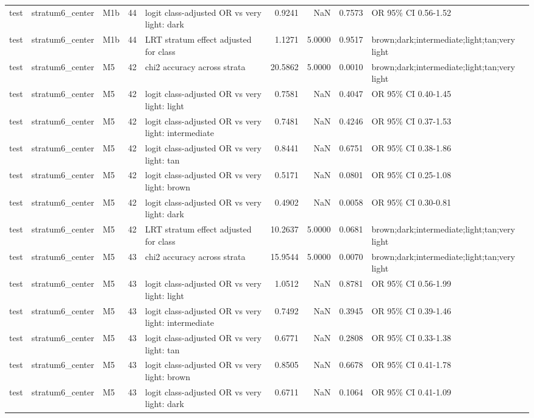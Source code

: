 \begin{tabular}{lllrlrrrl}
test & stratum6\_center & M1b & 44 & logit class-adjusted OR vs very light: dark & 0.9241 & NaN & 0.7573 & OR 95\% CI 0.56-1.52 \\
test & stratum6\_center & M1b & 44 & LRT stratum effect adjusted for class & 1.1271 & 5.0000 & 0.9517 & brown;dark;intermediate;light;tan;very light \\
test & stratum6\_center & M5 & 42 & chi2 accuracy across strata & 20.5862 & 5.0000 & 0.0010 & brown;dark;intermediate;light;tan;very light \\
test & stratum6\_center & M5 & 42 & logit class-adjusted OR vs very light: light & 0.7581 & NaN & 0.4047 & OR 95\% CI 0.40-1.45 \\
test & stratum6\_center & M5 & 42 & logit class-adjusted OR vs very light: intermediate & 0.7481 & NaN & 0.4246 & OR 95\% CI 0.37-1.53 \\
test & stratum6\_center & M5 & 42 & logit class-adjusted OR vs very light: tan & 0.8441 & NaN & 0.6751 & OR 95\% CI 0.38-1.86 \\
test & stratum6\_center & M5 & 42 & logit class-adjusted OR vs very light: brown & 0.5171 & NaN & 0.0801 & OR 95\% CI 0.25-1.08 \\
test & stratum6\_center & M5 & 42 & logit class-adjusted OR vs very light: dark & 0.4902 & NaN & 0.0058 & OR 95\% CI 0.30-0.81 \\
test & stratum6\_center & M5 & 42 & LRT stratum effect adjusted for class & 10.2637 & 5.0000 & 0.0681 & brown;dark;intermediate;light;tan;very light \\
test & stratum6\_center & M5 & 43 & chi2 accuracy across strata & 15.9544 & 5.0000 & 0.0070 & brown;dark;intermediate;light;tan;very light \\
test & stratum6\_center & M5 & 43 & logit class-adjusted OR vs very light: light & 1.0512 & NaN & 0.8781 & OR 95\% CI 0.56-1.99 \\
test & stratum6\_center & M5 & 43 & logit class-adjusted OR vs very light: intermediate & 0.7492 & NaN & 0.3945 & OR 95\% CI 0.39-1.46 \\
test & stratum6\_center & M5 & 43 & logit class-adjusted OR vs very light: tan & 0.6771 & NaN & 0.2808 & OR 95\% CI 0.33-1.38 \\
test & stratum6\_center & M5 & 43 & logit class-adjusted OR vs very light: brown & 0.8505 & NaN & 0.6678 & OR 95\% CI 0.41-1.78 \\
test & stratum6\_center & M5 & 43 & logit class-adjusted OR vs very light: dark & 0.6711 & NaN & 0.1064 & OR 95\% CI 0.41-1.09 \\

\end{tabular}
